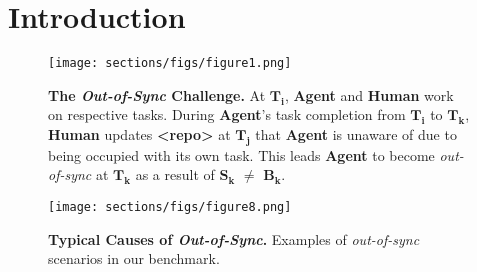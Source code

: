 


\section{Introduction}
\label{Section: Introduction}


\begin{figure}[H]
\begin{center}
\begin{small}
    \vspace{-0.3em}    %
    \texttt{[image: sections/figs/figure1.png]}
    \vspace{-1.8em}  %
    \caption{
    \small
    \textbf{The \textit{Out-of-Sync} Challenge.} At \colorbox{fig1_pass}{\textcolor{fig1_white}{$\mathbf{T}_{\bm{i}}$}}, \textcolor{fig1_agent}{\textbf{Agent}} and \textcolor{fig1_human}{\textbf{Human}} work on respective tasks. During \textcolor{fig1_agent}{\textbf{Agent}}'s task completion from \colorbox{fig1_pass}{\textcolor{fig1_white}{$\mathbf{T}_{\bm{i}}$}} to \colorbox{fig1_fail}{\textcolor{fig1_white}{$\mathbf{T}_{\bm{k}}$}}, \textcolor{fig1_human}{\textbf{Human}} updates \textbf{\textless repo\textgreater} at \colorbox{fig1_pass}{\textcolor{fig1_white}{$\mathbf{T}_{\bm{j}}$}} that \textcolor{fig1_agent}{\textbf{Agent}} is unaware of due to being occupied with its own task. This leads \textcolor{fig1_agent}{\textbf{Agent}} to become \textit{out-of-sync} at \colorbox{fig1_fail}{\textcolor{fig1_white}{$\mathbf{T}_{\bm{k}}$}} as a result of \textcolor{fig1_human}{$\bm{S_k}$} $\neq$ \textcolor{fig1_agent}{$\bm{B_k}$}.}
    \vspace{-1.5em}    %
    \label{fig:figure 1}
\end{small}
\end{center}
\end{figure}



\begin{figure*}[!t]
\begin{center}
\begin{small}
\vspace{-0.5em}
\texttt{[image: sections/figs/figure8.png]}
    \vspace{-2em}  %
    \caption{\textbf{Typical Causes of \textit{Out-of-Sync}.} Examples of \textit{out-of-sync} scenarios in our benchmark.}
    \label{fig:figure 8 (Typical Causes)}
    \vspace{-1.6em}
\end{small}
\end{center}
\end{figure*}









